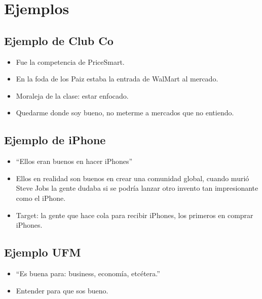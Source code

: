\section{Ejemplos}
\subsection{Ejemplo de Club Co}
\begin{itemize}
    \item Fue la competencia de PriceSmart.
    \item En la foda de los Paiz estaba la entrada de WalMart al mercado.
    \item Moraleja de la clase: estar enfocado.
    \item Quedarme donde soy bueno, no meterme a mercados que no entiendo.
\end{itemize}


\subsection{Ejemplo de iPhone}
\begin{itemize}
    \item ``Ellos eran buenos en hacer iPhones''
    \item Ellos en realidad son buenos en crear una comunidad global, cuando murió Steve Jobs la gente dudaba si se podría lanzar otro invento tan impresionante como el iPhone.
    \item Target: la gente que hace cola para recibir iPhones, los primeros en comprar iPhones.
\end{itemize}


\subsection{Ejemplo UFM}
\begin{itemize}
    \item ``Es buena para: business, economía, etcétera.''
    \item Entender para que sos bueno.
\end{itemize}


